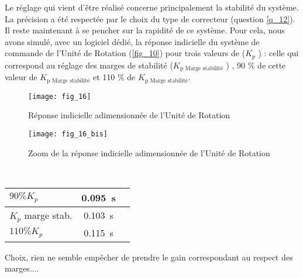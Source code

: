 Le réglage qui vient d’être réalisé concerne principalement la stabilité du système. La précision a été respectée
par le choix du type de correcteur (question \ref{q_12}). Il reste maintenant à se
pencher sur la rapidité de ce système.
Pour cela, nous avons simulé, avec un
logiciel dédié, la réponse indicielle du
système de commande de l’Unité de
Rotation (\autoref{fig_10}) pour trois valeurs de
($K_p$ ) : celle qui correspond au réglage des marges de stabilité
($K_{\text{p Marge stabilité}}$ ) , 90 \% de cette valeur
de $K_{\text{p Marge stabilité}}$ et 110 \% de
$K_{\text{p Marge stabilité}}$.

\begin{minipage}[c]{.47\linewidth}
\begin{figure}[H]
\centering
\texttt{[image: fig\_16]}
\caption{\label{fig_16}Réponse indicielle adimensionnée de l’Unité de Rotation}
\end{figure}
\end{minipage}\hfill
\begin{minipage}[c]{.47\linewidth}
\begin{figure}[H]
\centering
\texttt{[image: fig\_16\_bis]}
\caption{\label{fig_16b} Zoom de la réponse indicielle adimensionnée de l’Unité de Rotation}
\end{figure}
\end{minipage}
\fi

\ifprof
\begin{corrige} ~\\
\begin{center}
\begin{tabular}{lcc}
\hline
$90\% K_p$ & \SI{0,095}{s} & \\ \hline
$K_p$ marge stab. &  \SI{0,103}{s}& \\ \hline
$110\% K_p$ & \SI{0,115}{s} & \\ \hline
\end{tabular}
\end{center}

Choix, rien ne semble empêcher de prendre le gain correspondant au respect des marges....
\end{corrige}
\else
\fi


